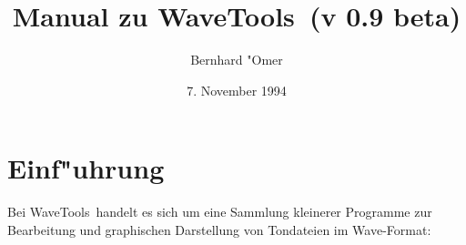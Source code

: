 

\def\wavetools{{\sc WaveTools}}
\def\winf{{\tt winf}}
\def\wcat{{\tt wcat}}
\def\wcut{{\tt wcut}}
\def\wflt{{\tt wflt}}
\def\wfct{{\tt wfct}}
\def\wmix{{\tt wmix}}
\def\wview{{\tt wview}}
\def\wplot{{\tt wplot}}
\def\sexp#1{$\langle${\it #1\/}$\rangle$}
\def\snum#1#2{\rm\##1$_{#2}$}
\def\btxt{\begin{quote}\raggedright\sloppy\noindent\tt}
\def\etxt{\end{quote}}
\def\txt#1{\btxt #1 \etxt}
\def\txtund{{\rm\qquad und} \newline}
\def\bs{$\tt\backslash$}
\def\syntax#1#2{
  \noindent\begin{tabular}{@{} l @{}}
    \bf Syntax: 
    \tt #1 \rm [{\it\ options }\/] #2
  \end{tabular}
  \vskip3mm
}
\def\options#1{%
  \noindent\begin{tabular}{@{} l @{\ } l @{\ } l @{\ } l}
    \bf Options:\rm &#1
  \end{tabular}
  \vskip3mm
}
\def\opt#1{{\tt -#1}}
\def\optarg#1#2{{{\tt -#1}\sexp{#2}}}
\def\multiopt#1{\multicolumn{3}{@{} l @{}}{#1}}
\def\stdopt{&\multiopt{\optarg{o}{output file}, \opt{h}, \opt{v}}}
\def\bildbox#1#2#3{
  \centerline{\fbox{\epsffile{#1}}}
  \small\caption{\bf #2}\label{#3}
}
\def\bild#1#2#3{
  \begin{figure}[hbt]
  \bildbox{#1}{#2}{#3}
  \end{figure}
}
\def\bilder#1#2#3#4#5{
  \begin{figure}[hbt]
    \hfill
    \parbox{70mm}{\bildbox{#1}{#2}{#5-a}}
    \hfill
    \parbox{70mm}{\bildbox{#3}{#4}{#5-b}}
    \hfill
  \end{figure}
}
\pagestyle{headings}



\title{Manual zu \wavetools\ (v 0.9 beta)}
\author{Bernhard "Omer}
\date{7. November 1994}

\maketitle


\section{Einf"uhrung}

Bei \wavetools\ handelt es sich um eine Sammlung kleinerer Programme
zur Bearbeitung und graphischen Darstellung von Tondateien im Wave-Format:

